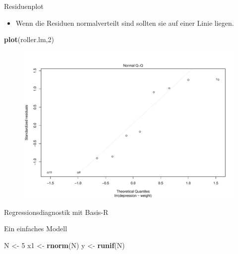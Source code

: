 \documentclass[ignorenonframetext,]{beamer}
\newenvironment{Shaded}{}{}
\newcommand{\KeywordTok}[1]{\textcolor[rgb]{0.00,0.44,0.13}{\textbf{{#1}}}}
\newcommand{\DecValTok}[1]{\textcolor[rgb]{0.25,0.63,0.44}{{#1}}}
\newcommand{\StringTok}[1]{\textcolor[rgb]{0.25,0.44,0.63}{{#1}}}
\newcommand{\NormalTok}[1]{{#1}}
\providecommand{\tightlist}{%
\setlength{\itemsep}{0pt}\setlength{\parskip}{0pt}}
\begin{document}
\begin{frame}[fragile]{Residuenplot}

\begin{itemize}
\tightlist
\item
  Wenn die Residuen normalverteilt sind sollten sie auf einer Linie
  liegen.
\end{itemize}

\begin{Shaded}
\begin{Highlighting}[]
\KeywordTok{plot}\NormalTok{(roller.lm,}\DecValTok{2}\NormalTok{)}
\end{Highlighting}
\end{Shaded}

\begin{figure}[htbp]
\centering
\includegraphics{RSocialScience2_files/figure-beamer/unnamed-chunk-71-1.pdf}
\caption{}
\end{figure}

\end{frame}

\begin{frame}[fragile]{Regressionsdiagnostik mit Basis-R}

Ein einfaches Modell

\begin{Shaded}
\begin{Highlighting}[]
\NormalTok{N <-}\StringTok{ }\DecValTok{5}
\NormalTok{x1 <-}\StringTok{ }\KeywordTok{rnorm}\NormalTok{(N)}
\NormalTok{y <-}\StringTok{ }\KeywordTok{runif}\NormalTok{(N)}
\end{Highlighting}
\end{Shaded}

\end{frame}
\end{document}
